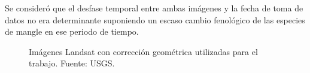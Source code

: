 
Se consideró que el desfase temporal entre ambas imágenes y la fecha de toma de datos no era determinante suponiendo un escaso cambio fenológico de las especies de mangle en ese periodo de tiempo.\Sep

\begin{figure}
	\centering
	\caption[Imágenes Landsat]{Imágenes Landsat con corrección geométrica utilizadas para el trabajo. Fuente: USGS.}
	\label{fig:imagenesLandsat}
\end{figure}

